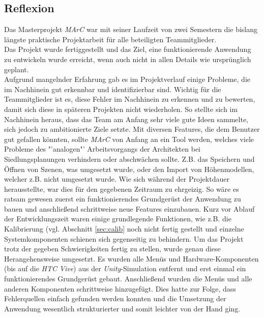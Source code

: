 \subsection{Reflexion}\label{sec:reflexion}
Das Masterprojekt \textit{MArC} war mit seiner Laufzeit von zwei Semestern die bislang längste praktische Projektarbeit für alle beteiligten Teammitglieder. \\
Das Projekt wurde fertiggestellt und das Ziel, eine funktionierende Anwendung zu entwickeln wurde erreicht, wenn auch nicht in allen Details wie ursprünglich geplant.\\
Aufgrund mangelnder Erfahrung gab es im Projektverlauf einige Probleme, die im Nachhinein gut erkennbar und identifizierbar sind. Wichtig für die Teammitglieder ist es, diese Fehler im Nachhinein zu erkennen und zu bewerten, damit sich diese in späteren Projekten nicht wiederholen. So stellte sich im Nachhinein heraus, dass das Team am Anfang sehr viele gute Ideen sammelte, sich jedoch zu ambitionierte Ziele setzte. Mit diversen Features, die dem Benutzer gut gefallen könnten, sollte \emph{MArC} von Anfang an ein Tool werden, welches viele Probleme des "'analogen"' Arbeitsvorgangs der Architekten bei Siedlungsplanungen verhindern oder abschwächen sollte. Z.B. das Speichern und Öffnen von Szenen, was umgesetzt wurde, oder den Import von Höhenmodellen, welcher z.B. nicht umgesetzt wurde.
Wie sich während der Projektdauer herausstellte, war dies für den gegebenen Zeitraum zu ehrgeizig.
So wäre es ratsam gewesen zuerst ein funktionierendes Grundgerüst der Anwendung zu bauen und anschließend schrittweise neue Features einzubauen. Kurz vor Ablauf der Entwicklungszeit waren einige grundlegende Funktionen, wie z.B. die Kalibrierung (vgl. Abschnitt \ref{sec:calib} noch nicht fertig gestellt und einzelne Systemkomponenten schienen sich gegenseitig zu behindern. Um das Projekt trotz der gegeben Schwierigkeiten fertig zu stellen, wurde genau diese Herangehensweise umgesetzt. Es wurden alle Menüs und Hardware-Komponenten (bis auf die \textit{HTC Vive}) aus der \textit{Unity}-Simulation entfernt und erst einmal ein funktionierendes Grundgerüst gebaut. Anschließend wurden die Menüs und alle anderen Komponenten schrittweise hinzugefügt. Dies hatte zur Folge, dass Fehlerquellen einfach gefunden werden konnten und die Umsetzung der Anwendung wesentlich strukturierter und somit leichter von der Hand ging.\\
